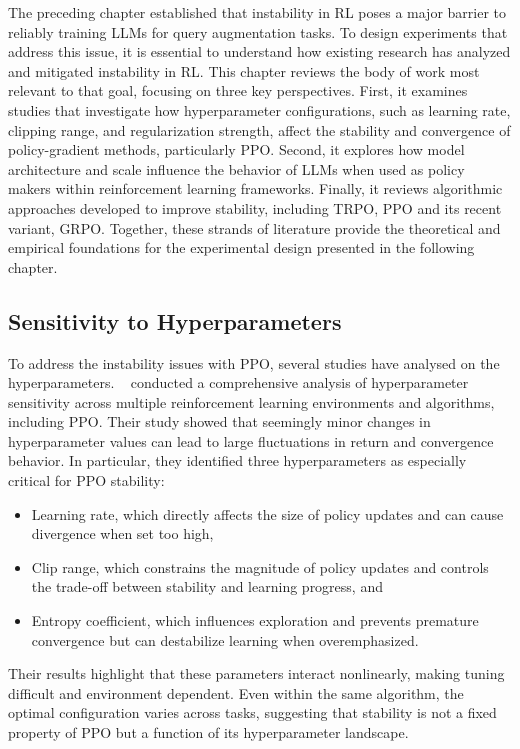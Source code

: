 The preceding chapter established that instability in RL poses a major barrier to reliably training LLMs for query augmentation tasks. To design experiments that address this issue, it is essential to understand how existing research has analyzed and mitigated instability in RL. This chapter reviews the body of work most relevant to that goal, focusing on three key perspectives. First, it examines studies that investigate how hyperparameter configurations, such as learning rate, clipping range, and regularization strength, affect the stability and convergence of policy-gradient methods, particularly PPO. Second, it explores how model architecture and scale influence the behavior of LLMs when used as policy makers within reinforcement learning frameworks. Finally, it reviews algorithmic approaches developed to improve stability, including TRPO, PPO and its recent variant, GRPO. Together, these strands of literature provide the theoretical and empirical foundations for the experimental design presented in the following chapter.

\subsection{Sensitivity to Hyperparameters}
To address the instability issues with PPO, several studies have analysed on the hyperparameters. \citeauthor{eimer2023hyperparameters}~\cite{eimer2023hyperparameters} conducted a comprehensive analysis of hyperparameter sensitivity across multiple reinforcement learning environments and algorithms, including PPO. Their study showed that seemingly minor changes in hyperparameter values can lead to large fluctuations in return and convergence behavior. In particular, they identified three hyperparameters as especially critical for PPO stability:
\begin{itemize}
    \item Learning rate, which directly affects the size of policy updates and can cause divergence when set too high,
    \item Clip range, which constrains the magnitude of policy updates and controls the trade-off between stability and learning progress, and
    \item Entropy coefficient, which influences exploration and prevents premature convergence but can destabilize learning when overemphasized.
\end{itemize}
Their results highlight that these parameters interact nonlinearly, making tuning difficult and environment dependent. Even within the same algorithm, the optimal configuration varies across tasks, suggesting that stability is not a fixed property of PPO but a function of its hyperparameter landscape.

